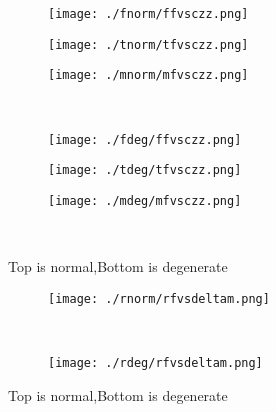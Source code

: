\documentclass[aps,floats,floatfix,nofootinbib]{revtex4-1}
\begin{document}
\begin{center}
\begin{figure}
\begin{subfigure}{0.3\textwidth}
\texttt{[image: ./fnorm/ffvsczz.png]}
\label{}
\end{subfigure}
\begin{subfigure}{0.3\textwidth}
\texttt{[image: ./tnorm/tfvsczz.png]}
\label{}
\end{subfigure}
\begin{subfigure}{0.3\textwidth}
\texttt{[image: ./mnorm/mfvsczz.png]}
\label{}
\end{subfigure}\\
\begin{subfigure}{0.3\textwidth}
\texttt{[image: ./fdeg/ffvsczz.png]}
\label{}
\end{subfigure}
\begin{subfigure}{0.3\textwidth}
\texttt{[image: ./tdeg/tfvsczz.png]}
\label{}
\end{subfigure}
\begin{subfigure}{0.3\textwidth}
\texttt{[image: ./mdeg/mfvsczz.png]}
\label{}
\end{subfigure}\\
\caption{Top is normal,Bottom is degenerate}
\end{figure}
\end{center}

\begin{center}
\begin{figure}
\begin{subfigure}{0.95\textwidth}
\texttt{[image: ./rnorm/rfvsdeltam.png]}
\label{}
\end{subfigure}\\
\begin{subfigure}{0.95\textwidth}
\texttt{[image: ./rdeg/rfvsdeltam.png]}
\label{}
\end{subfigure}
\caption{Top is normal,Bottom is degenerate}
\end{figure}
\end{center}
\end{document}
